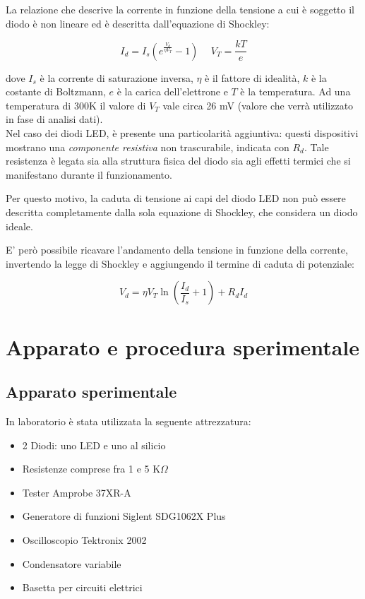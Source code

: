 \documentclass[9pt,a4paper,twocolumn,twoside]{tau-class/tau}
\begin{document}
La relazione che descrive la corrente in funzione della tensione a cui è soggetto il diodo è non lineare ed è descritta dall'equazione di Shockley:

\begin{equation}
      I_d=I_s \left(e^{\frac{V_d}{\eta V_T}}-1\right) \hspace{15pt} V_T=\frac{kT}{e}
      \label{eq:Id}
\end{equation}

dove $I_s$ è la corrente di saturazione inversa, $\eta$ è il fattore di idealità, $k$ è la costante di Boltzmann, $e$ è la carica dell'elettrone e $T$ è la temperatura. Ad una temperatura di 300K il valore di $V_T$ vale circa 26 mV (valore che verrà utilizzato in fase di analisi dati).\\
Nel caso dei diodi LED, è presente una particolarità aggiuntiva: questi dispositivi mostrano una \textit{componente resistiva} non trascurabile, indicata con \( R_d \). Tale resistenza è legata sia alla struttura fisica del diodo sia agli effetti termici che si manifestano durante il funzionamento.

Per questo motivo, la caduta di tensione ai capi del diodo LED non può essere descritta completamente dalla sola equazione di Shockley, che considera un diodo ideale.

E' però possibile ricavare l'andamento della tensione in funzione della corrente, invertendo la legge di Shockley e aggiungendo il termine di caduta di potenziale:

\begin{equation}
    V_d=\eta V_T \ln\left(\frac{I_d}{I_s}+1\right)+R_dI_d
    \label{eq:Vd}
\end{equation}

\section{Apparato e procedura sperimentale}

\subsection{Apparato sperimentale}
In laboratorio è stata utilizzata la seguente attrezzatura:
\begin{itemize}
    \item 2 Diodi: uno LED e uno al silicio
    \item Resistenze comprese fra 1 e 5 K$\Omega$
    \item Tester Amprobe 37XR-A
    \item Generatore di funzioni Siglent SDG1062X Plus
    \item Oscilloscopio Tektronix 2002
    \item Condensatore variabile
    \item Basetta per circuiti elettrici 
\end{itemize} 
\end{document}
